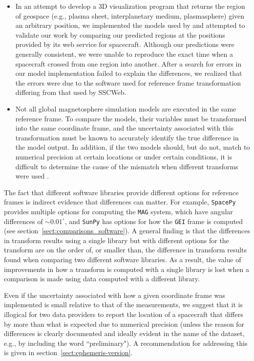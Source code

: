 \documentclass[draft]{agujournal2019}
\begin{document}
\begin{itemize}
\item In an attempt to develop a 3D visualization program that returns the region of geospace (e.g., plasma sheet, interplanetary medium, plasmasphere) given an arbitrary position, we implemented the models used by \cite{SSCWeb} and attempted to validate our work by comparing our predicted regions at the positions provided by its web service for spacecraft. Although our predictions were generally consistent, we were unable to reproduce the exact time when a spacecraft crossed from one region into another. After a search for errors in our model implementation failed to explain the differences, we realized that the errors were due to the software used for reference frame transformation differing from that used by SSCWeb.

\item Not all global magnetosphere simulation models are executed in the same reference frame. To compare the models, their variables must be transformed into the same coordinate frame, and the uncertainty associated with this transformation must be known to accurately identify the true difference in the model output. In addition, if the two models should, but do not, match to numerical precision at certain locations or under certain conditions, it is difficult to determine the cause of the mismatch when different transforms were used \cite{Thomas2025}. 
\end{itemize}

The fact that different software libraries provide different options for reference frames is indirect evidence that differences can matter. For example, \texttt{SpacePy} \cite{SpacePy} provides multiple options for computing the \texttt{MAG} system, which have angular differences of ${\sim}0.01^\circ$, and \texttt{SunPy} \cite{SunPy} has options for how the \texttt{GEI} frame is computed (see section~\ref{sect:comparisons_software}). A general finding is that the differences in transform results using a single library but with different options for the transform are on the order of, or smaller than, the difference in transform results found when comparing two different software libraries. As a result, the value of improvements in how a transform is computed with a single library is lost when a comparison is made using data computed with a different library. 

Even if the uncertainty associated with how a given coordinate frame was implemented is small relative to that of the measurements, we suggest that it is illogical for two data providers to report the location of a spacecraft that differs by more than what is expected due to numerical precision (unless the reason for differences is clearly documented and ideally evident in the name of the dataset, e.g., by including the word ``preliminary"). A recommendation for addressing this is given in section~\ref{sect:ephemeris-version}.
\end{document}
